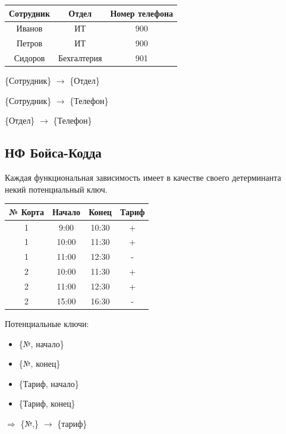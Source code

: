 \documentclass[a4paper, 14pt]{report}
\begin{document}
\begin{table}[H]
    \centering
    \begin{tabular}{|c|c|c|}
        \hline
        Сотрудник & Отдел & Номер телефона \\
        \hline
        Иванов & ИТ & 900 \\
        Петров & ИТ & 900 \\
        Сидоров & Бехгалтерия & 901 \\
        \hline
    \end{tabular}
\end{table}

\{Сотрудник\} $\to$ \{Отдел\}

\{Сотрудник\} $\to$ \{Телефон\}

\{Отдел\} $\to$ \{Телефон\}

\subsection{НФ Бойса-Кодда}

Каждая функциональная зависимость имеет в качестве своего детерминанта некий потенциальный ключ.

\begin{table}[H]
    \centering
    \begin{tabular}{|c|c|c|c|}
        \hline
        № Корта & Начало & Конец & Тариф \\
        \hline
        1 & 9:00  & 10:30 & + \\
        1 & 10:00 & 11:30 & + \\
        1 & 11:00 & 12:30 & - \\
        2 & 10:00 & 11:30 & + \\
        2 & 11:00 & 12:30 & + \\
        2 & 15:00 & 16:30 & - \\
        \hline
    \end{tabular}
\end{table}

Потенциальные ключи:

\begin{itemize}
    \item \{№, начало\}
    \item \{№, конец\}
    \item \{Тариф, начало\}
    \item \{Тариф, конец\}
\end{itemize}

$\Rightarrow$ \{№,\} $\to$ \{тариф\}
\end{document}
